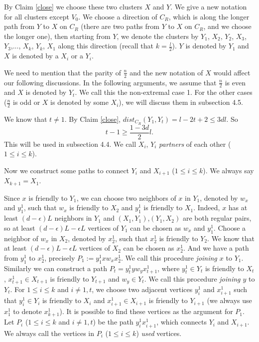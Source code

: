 \documentclass[11pt]{article}
\begin{document}
By Claim \ref{close} we choose these two clusters $X$ and $Y$. We give a new notation for all clusters except $V_0$. We choose a direction of $C_R$, which is along the longer path from $Y$ to $X$ on $C_R$ (there are two paths from $Y$ to $X$ on $C_R$, and we choose the longer one), then starting from $Y$, we denote the clusters by $Y_1$, $X_2$, $Y_2$, $X_3$, $Y_3$,..., $X_k$, $Y_k$, $X_1$ along this direction (recall that $k=\frac{l}{2}$). $Y$ is denoted by $Y_1$ and $X$ is denoted by a $X_i$ or a $Y_i$.

We need to mention that the parity of $\frac{n}{2}$ and the new notation of $X$ would affect our following discussions. In the following arguments, we assume that $\frac{n}{2}$ is even and $X$ is denoted by $Y_t$. We call this the non-extremal case 1. For the other cases ($\frac{n}{2}$ is odd or $X$ is denoted by some $X_i$), we will discuss them in subsection 4.5.

We know that $t\not =1$. By Claim \ref{close}, $dist_{C_R}(Y_1,Y_t)=l-2t+2\leq 3dl$. So
\begin{equation}\label{t}
t-1\geq \frac{1-3d}{2}l.
\end{equation}
This will be used in subsection 4.4. We call $X_i$, $Y_i$ {\em partners} of each other ($1\leq i\leq k$).

Now we construct some paths to connect $Y_i$ and $X_{i+1}$ ($1\leq i\leq k$). We always say $X_{k+1}=X_1$.

Since $x$ is friendly to $Y_1$, we can choose two neighbors of $x$ in $Y_1$, denoted by $w_x$ and $y_1^1$, such that $w_x$ is friendly to $X_2$ and $y_1^1$ is friendly to $X_1$. Indeed, $x$ has at least $(d-\epsilon)L$ neighbors in $Y_1$ and $(X_1,Y_1)$,$(Y_1,X_2)$ are both regular pairs, so at least $(d-\epsilon)L-\epsilon L$ vertices of $Y_1$ can be chosen as $w_x$ and $y_1^1$. Choose a neighbor of $w_x$ in $X_2$, denoted by $x_2^1$, such that $x_2^1$ is friendly to $Y_2$. We know that at least $(d-\epsilon)L-\epsilon L$ vertices of $X_2$ can be chosen as $x_2^1$. And we have a path from $y_1^1$ to $x_2^1$, precisely $P_1:=y_1^1xw_xx_2^1$. We call this procedure {\em joining $x$} to $Y_1$. Similarly we can construct a path $P_t=y_t^1yw_yx_{t+1}^1$, where $y_t^1\in Y_t$ is friendly to $X_t$, $x_{t+1}^1\in X_{t+1}$ is friendly to $Y_{t+1}$ and $w_y\in Y_t$. We call this procedure {\em joining $y$} to $Y_t$. For $1\leq i\leq k$ and $i\not =1,t$, we choose two adjacent vertices $y_i^1$ and $x_{i+1}^1$ such that $y_i^1\in Y_i$ is friendly to $X_i$ and $x_{i+1}^1\in X_{i+1}$ is friendly to $Y_{i+1}$ (we always use $x_1^1$ to denote $x_{k+1}^1$). It is possible to find these vertices as the argument for $P_1$. Let $P_i$ ($1\leq i\leq k$ and $i\not =1,t$) be the path $y_i^1x_{i+1}^1$, which connects $Y_i$ and $X_{i+1}$. We always call the vertices in $P_i$ ($1\leq i\leq k$) {\em used} vertices.
\end{document}

